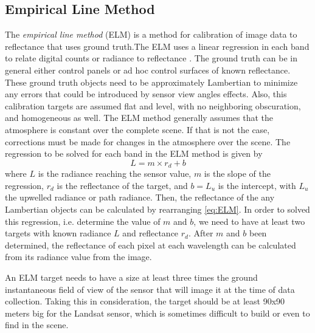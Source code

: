 \subsection{ Empirical Line Method}
\label{subsec:ELM}
The {\it empirical line method} (ELM) is a method for calibration of image data to reflectance that uses ground truth.The ELM uses a linear regression in each band to relate digital counts or radiance to reflectance \cite{Schott}. The ground truth can be in general  either control panels or ad hoc control surfaces of known reflectance. These ground truth objects need to be approximately Lambertian to minimize any errors that could be introduced by sensor view angles effects. Also, this calibration targets are assumed flat and level, with no neighboring obscuration, and homogeneous as well. The ELM method generally assumes that the atmosphere is constant over the complete scene. If that is not the case, corrections must be made for changes in the atmosphere over the scene. The regression to be solved for each band in the ELM method is given by
\begin{equation}
	\label{eq:ELM} 
	L = m\times r_d + b
\end{equation}
where $L$ is the radiance reaching the sensor value, $m$ is the slope of the regression, $r_d$ is the reflectance of the target, and $b=L_u$ is the intercept, with $L_u$ the upwelled radiance or path radiance. Then, the reflectance of the any Lambertian objects can be calculated by rearranging \autoref{eq:ELM}. In order to solved this regression, i.e. determine the value of $m$ and $b$, we need to have at least two targets with known radiance $L$ and reflectance $r_d$. After $m$ and $b$ been determined, the reflectance of each pixel at each wavelength can be calculated from its radiance value from the image.

An ELM target needs to have a size at least three times the ground instantaneous field of view of the sensor that will image it at the time of data collection. Taking this in consideration, the target should be at least 90x90 meters big for the Landsat sensor, which is sometimes difficult to build or even to find in the scene. 


